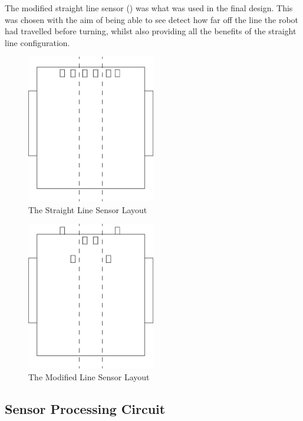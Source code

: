 \documentclass{article}
\begin{document}
The modified straight line sensor  () was what was used in the final design. This was chosen with the aim of being able to see detect how far off the line the robot had travelled before turning, whilst also providing all the benefits of the straight line configuration.

\begin{figure}[!h]
\centerline{\includegraphics[width=0.5\textwidth]{the_straight_line_sensor}}
\caption{The Straight Line Sensor Layout}
\label{fig:the_straight_line_sensor}
\end{figure}

\begin{figure}[!h]
\centerline{\includegraphics[width=0.5\textwidth]{modified_straight_line_sensor}}
\caption{The Modified Line Sensor Layout}
\label{fig:modified_straight_line_sensor}
\end{figure}

\clearpage

\subsection{Sensor Processing Circuit}
\end{document}
